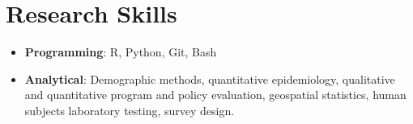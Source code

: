\documentclass[letterpaper,11pt]{article}
\begin{document}


\section*{Research Skills}
\begin{itemize}[leftmargin=*, label={}]

\item \textbf{Programming}: R, Python, Git, Bash 
\item \textbf{Analytical}: Demographic methods, quantitative epidemiology, qualitative and quantitative program and policy evaluation, geospatial statistics, human subjects laboratory testing, survey design.

\end{itemize}
\end{document}
